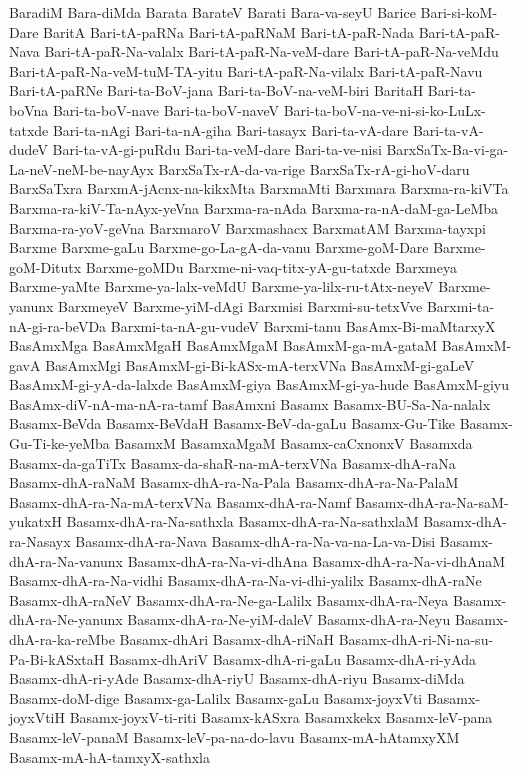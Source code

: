 {BaradiM
Bara-diMda
Barata
BarateV
Barati
Bara-va-seyU
Barice
Bari-si-koM-Dare
BaritA
Bari-tA-paRNa
Bari-tA-paRNaM
Bari-tA-paR-Nada
Bari-tA-paR-Nava
Bari-tA-paR-Na-valalx
Bari-tA-paR-Na-veM-dare
Bari-tA-paR-Na-veMdu
Bari-tA-paR-Na-veM-tuM-TA-yitu
Bari-tA-paR-Na-vilalx
Bari-tA-paR-Navu
Bari-tA-paRNe
Bari-ta-BoV-jana
Bari-ta-BoV-na-veM-biri
BaritaH
Bari-ta-boVna
Bari-ta-boV-nave
Bari-ta-boV-naveV
Bari-ta-boV-na-ve-ni-si-ko-LuLx-tatxde
Bari-ta-nAgi
Bari-ta-nA-giha
Bari-tasayx
Bari-ta-vA-dare
Bari-ta-vA-dudeV
Bari-ta-vA-gi-puRdu
Bari-ta-veM-dare
Bari-ta-ve-nisi
BarxSaTx-Ba-vi-ga-La-neV-neM-be-nayAyx
BarxSaTx-rA-da-va-rige
BarxSaTx-rA-gi-hoV-daru
BarxSaTxra
BarxmA-jAcnx-na-kikxMta
BarxmaMti
Barxmara
Barxma-ra-kiVTa
Barxma-ra-kiV-Ta-nAyx-yeVna
Barxma-ra-nAda
Barxma-ra-nA-daM-ga-LeMba
Barxma-ra-yoV-geVna
BarxmaroV
Barxmashacx
BarxmatAM
Barxma-tayxpi
Barxme
Barxme-gaLu
Barxme-go-La-gA-da-vanu
Barxme-goM-Dare
Barxme-goM-Ditutx
Barxme-goMDu
Barxme-ni-vaq-titx-yA-gu-tatxde
Barxmeya
Barxme-yaMte
Barxme-ya-lalx-veMdU
Barxme-ya-lilx-ru-tAtx-neyeV
Barxme-yanunx
BarxmeyeV
Barxme-yiM-dAgi
Barxmisi
Barxmi-su-tetxVve
Barxmi-ta-nA-gi-ra-beVDa
Barxmi-ta-nA-gu-vudeV
Barxmi-tanu
BasAmx-Bi-maMtarxyX
BasAmxMga
BasAmxMgaH
BasAmxMgaM
BasAmxM-ga-mA-gataM
BasAmxM-gavA
BasAmxMgi
BasAmxM-gi-Bi-kASx-mA-terxVNa
BasAmxM-gi-gaLeV
BasAmxM-gi-yA-da-lalxde
BasAmxM-giya
BasAmxM-gi-ya-hude
BasAmxM-giyu
BasAmx-diV-nA-ma-nA-ra-tamf
BasAmxni
Basamx
Basamx-BU-Sa-Na-nalalx
Basamx-BeVda
Basamx-BeVdaH
Basamx-BeV-da-gaLu
Basamx-Gu-Tike
Basamx-Gu-Ti-ke-yeMba
BasamxM
BasamxaMgaM
Basamx-caCxnonxV
Basamxda
Basamx-da-gaTiTx
Basamx-da-shaR-na-mA-terxVNa
Basamx-dhA-raNa
Basamx-dhA-raNaM
Basamx-dhA-ra-Na-Pala
Basamx-dhA-ra-Na-PalaM
Basamx-dhA-ra-Na-mA-terxVNa
Basamx-dhA-ra-Namf
Basamx-dhA-ra-Na-saM-yukatxH
Basamx-dhA-ra-Na-sathxla
Basamx-dhA-ra-Na-sathxlaM
Basamx-dhA-ra-Nasayx
Basamx-dhA-ra-Nava
Basamx-dhA-ra-Na-va-na-La-va-Disi
Basamx-dhA-ra-Na-vanunx
Basamx-dhA-ra-Na-vi-dhAna
Basamx-dhA-ra-Na-vi-dhAnaM
Basamx-dhA-ra-Na-vidhi
Basamx-dhA-ra-Na-vi-dhi-yalilx
Basamx-dhA-raNe
Basamx-dhA-raNeV
Basamx-dhA-ra-Ne-ga-Lalilx
Basamx-dhA-ra-Neya
Basamx-dhA-ra-Ne-yanunx
Basamx-dhA-ra-Ne-yiM-daleV
Basamx-dhA-ra-Neyu
Basamx-dhA-ra-ka-reMbe
Basamx-dhAri
Basamx-dhA-riNaH
Basamx-dhA-ri-Ni-na-su-Pa-Bi-kASxtaH
Basamx-dhAriV
Basamx-dhA-ri-gaLu
Basamx-dhA-ri-yAda
Basamx-dhA-ri-yAde
Basamx-dhA-riyU
Basamx-dhA-riyu
Basamx-diMda
Basamx-doM-dige
Basamx-ga-Lalilx
Basamx-gaLu
Basamx-joyxVti
Basamx-joyxVtiH
Basamx-joyxV-ti-riti
Basamx-kASxra
Basamxkekx
Basamx-leV-pana
Basamx-leV-panaM
Basamx-leV-pa-na-do-lavu
Basamx-mA-hAtamxyXM
Basamx-mA-hA-tamxyX-sathxla
}
